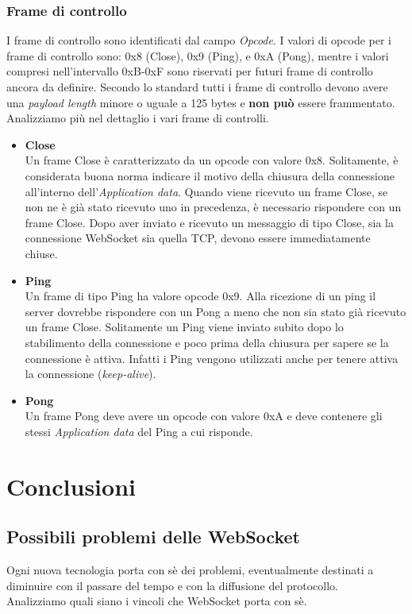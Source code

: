\documentclass[
  oneside,
  11pt, a4paper,
  footinclude=true,
  headinclude=true,
  cleardoublepage=empty
]{scrbook}
\begin{document}
\section{Frame di controllo}
I frame di controllo sono identificati dal campo \textit{Opcode}.
I valori di opcode per i frame di controllo sono: 0x8 (Close), 0x9 (Ping), e 0xA (Pong), mentre i valori compresi nell'intervallo 0xB-0xF sono riservati per futuri frame di controllo ancora da definire.
Secondo lo standard tutti i frame di controllo devono avere una \textit{payload length} minore o uguale a 125 bytes e \textbf{non può} essere frammentato.
Analizziamo più nel dettaglio i vari frame di controlli.
\begin{itemize}
    \item \textbf{Close}\\
    Un frame Close è caratterizzato da un opcode con valore 0x8.
    Solitamente, è considerata buona norma indicare il motivo della chiusura della connessione all'interno dell'\textit{Application data}.
    Quando viene ricevuto un frame Close, se non ne è già stato ricevuto uno in precedenza, è necessario rispondere con un frame Close.
    Dopo aver inviato e ricevuto un messaggio di tipo Close, sia la connessione WebSocket sia quella TCP, devono essere immediatamente chiuse.

\item \textbf{Ping}\\
    Un frame di tipo Ping ha valore opcode 0x9.
    Alla ricezione di un ping il server dovrebbe rispondere con un Pong a meno che non sia stato già ricevuto un frame Close.
    Solitamente un Ping viene inviato subito dopo lo stabilimento della connessione e poco prima della chiusura per sapere se la connessione è attiva.
    Infatti i Ping vengono utilizzati anche per tenere attiva la connessione (\textit{keep-alive}).
\item \textbf{Pong}\\
    Un frame Pong deve avere un opcode con valore 0xA e deve contenere gli stessi \textit{Application data} del Ping a cui risponde.
\end{itemize}
\part{Conclusioni}
\chapter{Possibili problemi delle WebSocket}
Ogni nuova tecnologia porta con sè dei problemi, eventualmente destinati a diminuire con il passare del tempo e con la diffusione del protocollo.\\
Analizziamo quali siano i vincoli che WebSocket porta con sè.
\end{document}
